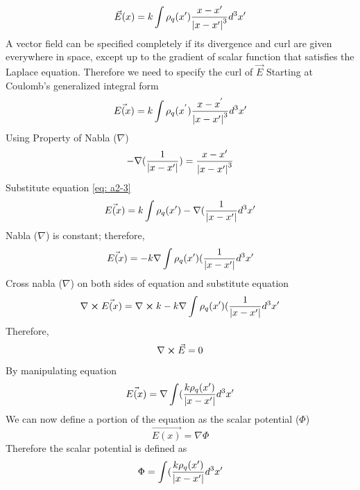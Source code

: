 \documentclass[12pt]{article}
\begin{document}
        \begin{equation} \label{eq: a2-5}
            \vec{E}(x)= k \int \rho_q(x') \frac{x-x'}{\abs{x - x'}^3}d^3x'
        \end{equation}
        A vector field can be specified completely if its divergence and curl are given everywhere in space, except up to the gradient of scalar function that satisfies the Laplace equation. 
        \newline Therefore we need to specify the curl of $\vec{E}$
        \newline Starting at Coulomb's generalized integral form 
        \begin{gather*}
            \vec{E(x)}= k \int \rho_q(x^{'}) \frac{x-x^{'}}{\abs{x - x'}^3}d^3x'
        \end{gather*}
        \newline Using Property of Nabla ($\nabla$)
        \begin{equation} \label{eq: a2-6}
            -\nabla(\frac{1}{\abs{x-x'}}) = \frac{x-x'}{\abs{x - x'}^3}
        \end{equation}
        Substitute equation \ref{eq: a2-3}
        \begin{equation} \label{eq: a2-7}
            \vec{E(x)}= k \int \rho_q(x') -\nabla(\frac{1}{\abs{x-x'}}d^3x'
        \end{equation}
        Nabla ($\nabla$) is constant; therefore,
        \begin{equation} \label{eq: a2-8}
            \vec{E(x)}= -k \nabla \int \rho_q(x') (\frac{1}{\abs{x-x'}}d^3x'
        \end{equation}
        Cross nabla ($\nabla$) on both sides of equation and substitute equation
        \begin{equation} \label{eq: a2-9}
            \nabla \cross \vec{E(x)}= \nabla \cross k -k\nabla \int \rho_q(x') (\frac{1}{\abs{x-x'}}d^3x'
        \end{equation}
        Therefore,
        \begin{equation} \label{eq: a2-10}
            \nabla \cross \vec{E} = 0
        \end{equation}
        By manipulating equation
        \begin{equation} \label{eq: a2-10}
            \vec{E(x)}= \nabla \int (\frac{k \rho_q (x')}{\abs{x-x'}}d^3x'
        \end{equation}
        We can now define a portion of the equation as the scalar potential ($\Phi$)
        \begin{equation} \label{eq: a2-11}
            \vec{E(x)}= \nabla \Phi
        \end{equation}
        Therefore the scalar potential is defined as 
        \begin{equation} \label{eq: a2-12}
            \Phi = \int (\frac{k \rho_q (x')}{\abs{x-x'}}d^3x'
        \end{equation}
\end{document}

